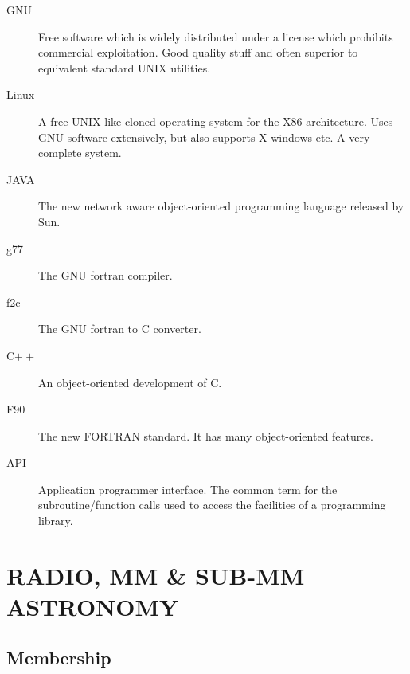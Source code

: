\begin{description}
\item[GNU]Free software which is widely distributed under a license which
prohibits commercial exploitation.  Good quality stuff and often
superior to equivalent standard UNIX utilities.
\item[Linux]A free UNIX-like cloned operating system for the X86 architecture.
Uses GNU software extensively, but also supports X-windows etc.  A
very complete system.
\item[JAVA]The new network aware object-oriented programming language released
by Sun.
\item[g77]The GNU fortran compiler.
\item[f2c]The GNU fortran to C converter.
\item[C$++$]An object-oriented development of C.
\item[F90]The new FORTRAN standard.  It has many object-oriented
features.
\item[API]Application programmer interface.  The common term for the
subroutine/function calls used to access the facilities of a
programming library.
\end{description}

\newpage
\section{RADIO, MM \& SUB-MM ASTRONOMY}

\subsection{Membership}


